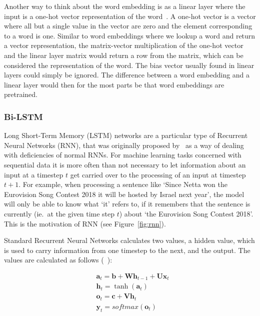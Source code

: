 Another way to think about the word embedding is as a linear layer where the
input is a one-hot vector representation of the word~\cite{goldberg2017nerual}.
A one-hot vector is a vector where all but a single value in the vector are zero
and the element corresponding to a word is one. Similar to word embeddings where
we lookup a word and return a vector representation, the matrix-vector
multiplication of the one-hot vector and the linear layer matrix would return a
row from the matrix, which can be considered the representation of the word. The
bias vector usually found in linear layers could simply be ignored. The
difference between a word embedding and a linear layer would then for the most
parts be that word embeddings are pretrained.

\subsubsection{Bi-LSTM}

Long Short-Term Memory (LSTM) networks are a particular type of Recurrent Neural
Networks (RNN), that was originally proposed by~\cite{hochreiter1997long} as a
way of dealing with deficiencies of normal RNNs. For machine learning tasks
concerned with sequential data it is more often than not necessary to let
information about an input at a timestep $t$ get carried over to the processing
of an input at timestep $t+1$. For example, when processing a sentence like
`Since Netta won the Eurovision Song Contest 2018 it will be hosted by Israel
next year', the model will only be able to know what `it' refers to, if it
remembers that the sentence is currently (ie.\ at the given time step $t$) about
`the Eurovision Song Contest 2018'. This is the motivation of RNN (see
Figure~\ref{fig:rnn}).

Standard Recurrent Neural Networks calculates two values, a hidden value, which
is used to carry information from one timestep to the next, and the output. The
values are calculated as follows (~\cite{goodfellow2016deep}):

\begin{align*}
    & \textbf{a}_t = \textbf{b} + \textbf{W} \textbf{h}_{t-1} + \textbf{U} \textbf{x}_t \\
    & \textbf{h}_t = \tanh(\textbf{a}_t) \\
    & \textbf{o}_t = \textbf{c} + \textbf{V} \textbf{h}_t \\
    & \textbf{y}_t = softmax(\textbf{o}_t)
\end{align*}

